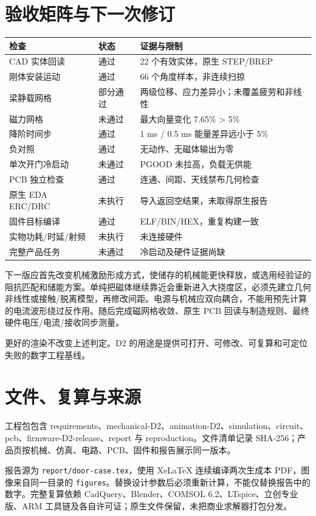 \documentclass[UTF8,fontset=fandol,11pt]{ctexart}
\begin{document}
\section{验收矩阵与下一次修订}
\begin{longtable}{p{.28\linewidth}p{.13\linewidth}p{.50\linewidth}}
\toprule 检查 & 状态 & 证据与限制\\\midrule
CAD 实体回读 & 通过 & 22 个有效实体，原生 STEP/BREP\\
刚体安装运动 & 通过 & 66 个角度样本，非连续扫掠\\
梁静载网格 & 部分通过 & 两级位移、应力差异小；未覆盖疲劳和非线性\\
磁力网格 & 未通过 & 最大向量变化 7.65\% > 5\%\\
降阶时间步 & 通过 & 1 ms / 0.5 ms 能量差异远小于 5\%\\
负对照 & 通过 & 无动作、无磁体输出为零\\
单次开门冷启动 & 未通过 & PGOOD 未拉高，负载无供能\\
PCB 独立检查 & 通过 & 连通、间距、天线禁布几何检查\\
原生 EDA ERC/DRC & 未执行 & 导入返回空结果，未取得原生报告\\
固件目标编译 & 通过 & ELF/BIN/HEX，重复构建一致\\
实物功耗/时延/射频 & 未执行 & 未连接硬件\\
完整产品任务 & 未通过 & 冷启动及硬件证据尚缺\\\bottomrule
\end{longtable}

下一版应首先改变机械激励形成方式，使储存的机械能更快释放，或选用经验证的阻抗匹配和储能方案。单纯把磁体继续靠近会重新进入大挠度区，必须先建立几何非线性或接触/脱离模型，再修改间距。电源与机械应双向耦合，不能用预先计算的电流波形绕过反作用。随后完成磁网格收敛、原生 PCB 回读与制造规则、最终硬件电压/电流/接收同步测量。

更好的渲染不改变上述判定。D2 的用途是提供可打开、可修改、可复算和可定位失败的数字工程基线。
\section{文件、复算与来源}
工程包包含 requirements、mechanical-D2、animation-D2、simulation、circuit、pcb、firmware-D2-release、report 与 reproduction。文件清单记录 SHA-256；产品页按机械、仿真、电路、PCB、固件和报告展示同一版本。

报告源为 \texttt{report/door-case.tex}，使用 XeLaTeX 连续编译两次生成本 PDF，图像来自同一目录的 \texttt{figures}。替换设计参数后必须重新计算，不能仅替换报告中的数字。完整复算依赖 CadQuery、Blender、COMSOL 6.2、LTspice、立创专业版、ARM 工具链及各自许可证；原生文件保留，未把商业求解器打包分发。
\end{document}
